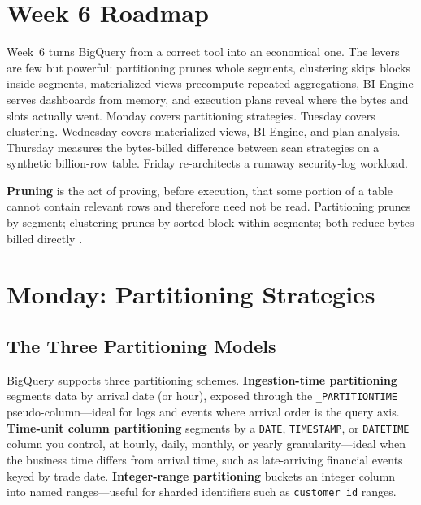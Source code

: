 \section{Week 6 Roadmap}
Week~6 turns BigQuery from a correct tool into an economical one. The levers are few but powerful: partitioning prunes whole segments, clustering skips blocks inside segments, materialized views precompute repeated aggregations, BI Engine serves dashboards from memory, and execution plans reveal where the bytes and slots actually went. Monday covers partitioning strategies. Tuesday covers clustering. Wednesday covers materialized views, BI Engine, and plan analysis. Thursday measures the bytes-billed difference between scan strategies on a synthetic billion-row table. Friday re-architects a runaway security-log workload.

\begin{definitionbox}
\textbf{Pruning} is the act of proving, before execution, that some portion of a table cannot contain relevant rows and therefore need not be read. Partitioning prunes by segment; clustering prunes by sorted block within segments; both reduce bytes billed directly \cite{googlecloudbigquerypartitioning,googlecloudbigqueryclustering}.
\end{definitionbox}

\section{Monday: Partitioning Strategies}

\subsection{The Three Partitioning Models}
BigQuery supports three partitioning schemes. \textbf{Ingestion-time partitioning} segments data by arrival date (or hour), exposed through the \texttt{\_PARTITIONTIME} pseudo-column---ideal for logs and events where arrival order is the query axis. \textbf{Time-unit column partitioning} segments by a \texttt{DATE}, \texttt{TIMESTAMP}, or \texttt{DATETIME} column you control, at hourly, daily, monthly, or yearly granularity---ideal when the business time differs from arrival time, such as late-arriving financial events keyed by trade date. \textbf{Integer-range partitioning} buckets an integer column into named ranges---useful for sharded identifiers such as \texttt{customer\_id} ranges.

